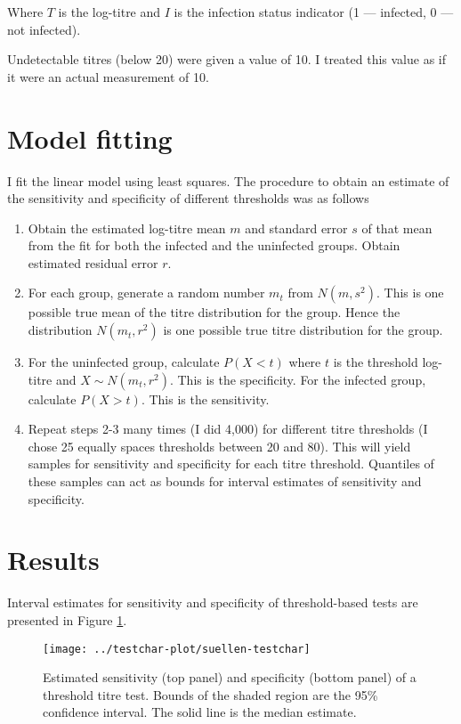 \documentclass[]{article}
\begin{document}
Where \(T\) is the log-titre and \(I\) is the infection status indicator
(1 --- infected, 0 --- not infected).

Undetectable titres (below 20) were given a value of 10. I treated this
value as if it were an actual measurement of 10.

\section{Model fitting}\label{model-fitting}

I fit the linear model using least squares. The procedure to obtain an
estimate of the sensitivity and specificity of different thresholds was
as follows

\begin{enumerate}
\def\labelenumi{\arabic{enumi}.}
\item
  Obtain the estimated log-titre mean \(m\) and standard error \(s\) of
  that mean from the fit for both the infected and the uninfected
  groups. Obtain estimated residual error \(r\).
\item
  For each group, generate a random number \(m_t\) from \(N(m, s^2)\).
  This is one possible true mean of the titre distribution for the
  group. Hence the distribution \(N(m_t, r^2)\) is one possible true
  titre distribution for the group.
\item
  For the uninfected group, calculate \(P(X < t)\) where \(t\) is the
  threshold log-titre and \(X \sim N(m_t, r^2)\). This is the
  specificity. For the infected group, calculate \(P(X > t)\). This is
  the sensitivity.
\item
  Repeat steps 2-3 many times (I did 4,000) for different titre
  thresholds (I chose 25 equally spaces thresholds between 20 and 80).
  This will yield samples for sensitivity and specificity for each titre
  threshold. Quantiles of these samples can act as bounds for interval
  estimates of sensitivity and specificity.
\end{enumerate}

\section{Results}\label{results}

Interval estimates for sensitivity and specificity of threshold-based
tests are presented in Figure \ref{fig:testchar}.





\begin{figure}

{\centering \texttt{[image: ../testchar-plot/suellen-testchar]} 

}

\caption{Estimated sensitivity (top panel) and specificity (bottom
panel) of a threshold titre test. Bounds of the shaded region are the
95\% confidence interval. The solid line is the median estimate.}\label{fig:testchar}
\end{figure}
\end{document}
